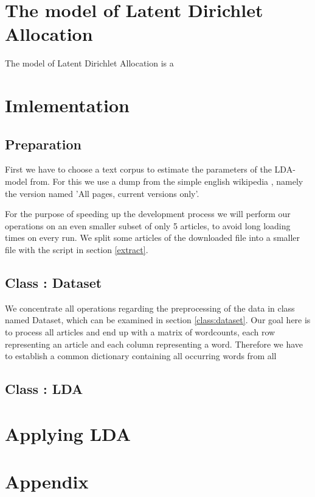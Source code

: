 \documentclass[15pt,landscape,twopage]{article}
\begin{document}
\section{The model of Latent Dirichlet Allocation}
The model of Latent Dirichlet Allocation is a
\section{Imlementation}
\subsection{Preparation}
First we have to choose a text corpus to estimate the parameters of the LDA-model from. For this we use a dump from the simple english wikipedia \cite{simplewi84:online}, namely the version named 'All pages, current versions only'.

For the purpose of speeding up the development process we will perform our operations on an even smaller subset of only 5 articles, to avoid long loading times on every run. We split some articles of the downloaded file into a smaller file with the script in section \ref{extract}.

\subsection{Class : Dataset}
We concentrate all operations regarding the preprocessing of the data in class named Dataset, which can be examined in section  \ref{class:dataset}. Our goal here is to process all articles and end up with a matrix of wordcounts, each row representing an article and each column representing a word. Therefore we have to establish a common dictionary containing all occurring words from all

\subsection{Class : LDA}

\section{Applying LDA}
\newpage




\newpage

\section{Appendix}
\end{document}
